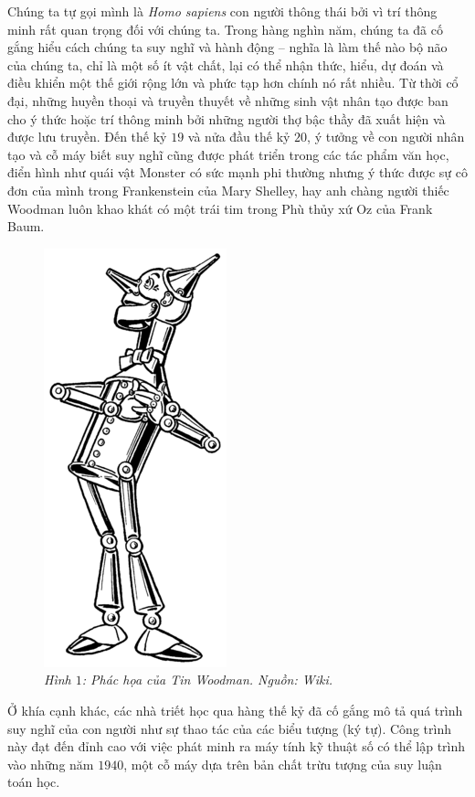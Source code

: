\begin{multicols}{2}
	Chúng ta tự gọi mình là \textit{Homo sapiens} con người thông thái bởi vì trí thông minh rất quan trọng đối với chúng ta. Trong hàng nghìn năm, chúng ta đã cố gắng hiểu cách chúng ta suy nghĩ và hành động -- nghĩa là làm thế nào bộ não của chúng ta, chỉ là một số ít vật chất, lại có thể nhận thức, hiểu, dự đoán và điều khiển một thế giới rộng lớn và phức tạp hơn chính nó rất nhiều. Từ thời cổ đại, những huyền thoại và truyền thuyết về những sinh vật nhân tạo được ban cho ý thức hoặc trí thông minh bởi những người thợ bậc thầy đã xuất hiện và được lưu truyền. Đến thế kỷ $19$ và nửa đầu thế kỷ $20$, ý tưởng về con người nhân tạo và cỗ máy biết suy nghĩ cũng được phát triển trong các tác phẩm văn học, điển hình như quái vật Monster có sức mạnh phi thường nhưng ý thức được sự cô đơn của mình trong Frankenstein của Mary Shelley, hay anh chàng người thiếc Woodman luôn khao khát có một trái tim trong Phù thủy xứ Oz của Frank Baum.
	\begin{figure}[H]
		\vspace*{-5pt}
		\centering
		\captionsetup{labelformat= empty, justification=centering}
		\includegraphics[width= 0.4\linewidth]{Tin_Woodman.png}
		\caption{\small\textit{\color{cackithi}Hình $1$: Phác họa của Tin Woodman. Nguồn: Wiki.}}
		\vspace*{-10pt}
	\end{figure}
	Ở khía cạnh khác, các nhà triết học qua hàng thế kỷ đã cố gắng mô tả quá trình suy nghĩ của con người như sự thao tác của các biểu tượng (ký tự). Công trình này đạt đến đỉnh cao với việc phát minh ra máy tính kỹ thuật số có thể lập trình vào những năm $1940$, một cỗ máy dựa trên bản chất trừu tượng của suy luận toán học. 

\end{multicols}
